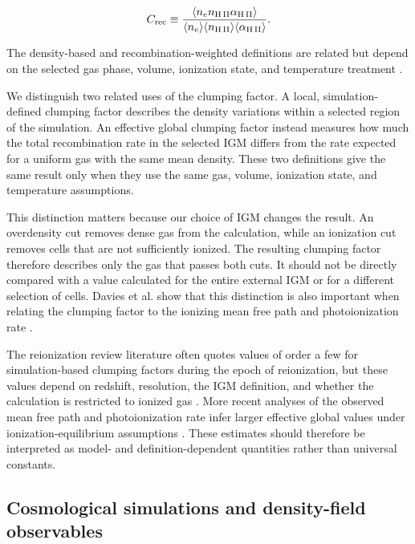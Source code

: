 \documentclass[%
 reprint,
nofootinbib,
 amsmath,amssymb,
 aps,
]{revtex4-2}
\begin{document}
\begin{equation}
C_{\rm rec} \equiv \frac{\left\langle n_e n_{\mathrm{H\,II}} \alpha_{\mathrm{H\,II}} \right\rangle}{\langle n_e\rangle \langle n_{\mathrm{H\,II}}\rangle \langle\alpha_{\mathrm{H\,II}}\rangle}.
\label{eq:recombination-clumping-factor}
\end{equation}

The density-based and recombination-weighted definitions are related but depend on the selected gas phase, volume, ionization state, and temperature treatment \cite{davies2024clumping,rahmati2013selfshielding}.


We distinguish two related uses of the clumping factor. A local, simulation-defined clumping factor describes the density variations within a selected region of the simulation. An effective global clumping factor instead measures how much the total recombination rate in the selected IGM differs from the rate expected for a uniform gas with the same mean density. These two definitions give the same result only when they use the same gas, volume, ionization state, and temperature assumptions.

This distinction matters because our choice of IGM changes the result. An overdensity cut removes dense gas from the calculation, while an ionization cut removes cells that are not sufficiently ionized. The resulting clumping factor therefore describes only the gas that passes both cuts. It should not be directly compared with a value calculated for the entire external IGM or for a different selection of cells. Davies et al. show that this distinction is also important when relating the clumping factor to the ionizing mean free path and photoionization rate \cite{davies2024clumping}.

The reionization review literature often quotes values of order a few for simulation-based clumping factors during the epoch of reionization, but these values depend on redshift, resolution, the IGM definition, and whether the calculation is restricted to ionized gas \cite{feng2019reionization}. More recent analyses of the observed mean free path and photoionization rate infer larger effective global values under ionization-equilibrium assumptions \cite{davies2024clumping}. These estimates should therefore be interpreted as model- and definition-dependent quantities rather than universal constants.


\subsection{Cosmological simulations and density-field observables}
\end{document}
